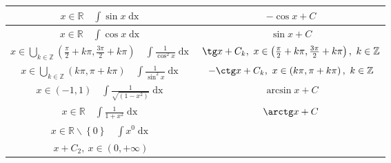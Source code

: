 \documentclass[11pt]{article}
\theoremstyle{plain}
\theoremstyle{serbnodot}
\DeclareMathOperator{\dx}{dx}
\begin{document}
\begin{tabular}{ |c|c| }
    $\displaystyle x \in \mathbb{R} \quad \int \sin x \dx$                                                                                     & $ \displaystyle-\cos x + C$                                                                        \\ \hline
    $\displaystyle x \in \mathbb{R} \quad \int \cos x \dx$                                                                                     & $ \displaystyle\sin x + C$                                                                         \\ \hline
    $\displaystyle x \in \bigcup_{k \in \mathbb{Z}} \left(\frac{\pi}{2} + k\pi, \frac{3\pi}{2} + k\pi\right)\quad \int \frac{1}{\cos^2 x} \dx$ & $ \tg x + C_k,\ x \in \left(\frac{\pi}{2} + k\pi, \frac{3\pi}{2} + k\pi\right),\ k \in \mathbb{Z}$ \\ \hline
    $\displaystyle x \in \bigcup_{k \in \mathbb{Z}} \left(k\pi, \pi + k\pi\right)\quad \int \frac{1}{\sin^2 x} \dx$                            & $ \displaystyle-\ctg x + C_k,\ x \in \left(k\pi, \pi + k\pi\right),\ k \in \mathbb{Z}$             \\ \hline
    $\displaystyle x \in \left(-1, 1\right) \quad \int \frac{1}{\sqrt{\left(1 - x^2\right)}} \dx                      $                        & $ \arcsin x + C$                                                                                   \\ \hline
    $\displaystyle x \in \mathbb{R} \quad \int \frac{1}{1+x^2} \dx$                                                                            & $ \arctg x + C$                                                                                    \\ \hline
    $\displaystyle x \in \mathbb{R}\backslash \left\{0\right\} \quad \int x^{0} \dx$                                                           &
    \makecell{
    $x + C_1,\ x \in \left(-\infty, 0\right)$                                                                                                                                                                                                       \\
        $x + C_2,\ x \in \left(0, +\infty\right)$
    }                                                                                                                                                                                                                                               \\ \hline
\end{tabular}
\end{document}
